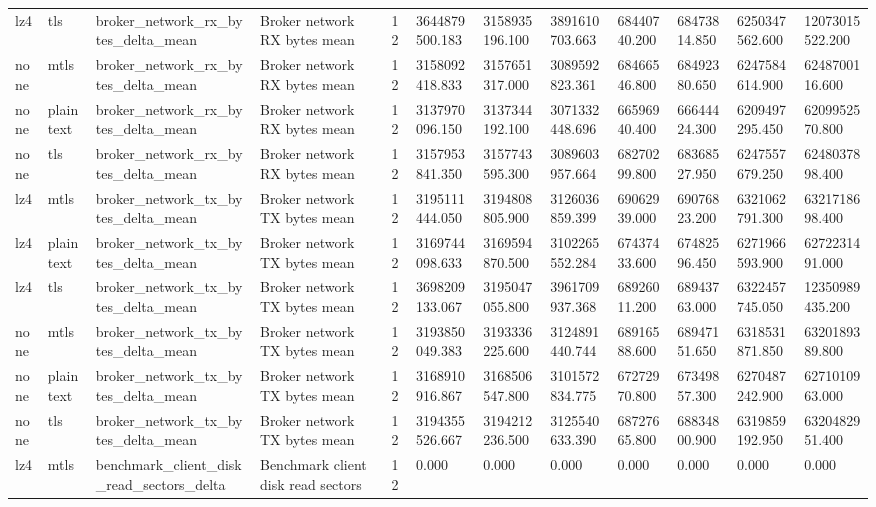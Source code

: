\begin{longtable}{llllllllllll}
lz4 & tls & broker\_network\_rx\_bytes\_delta\_mean & Broker network RX bytes mean & 12 & 3644879500.183 & 3158935196.100 & 3891610703.663 & 68440740.200 & 68473814.850 & 6250347562.600 & 12073015522.200 \\
none & mtls & broker\_network\_rx\_bytes\_delta\_mean & Broker network RX bytes mean & 12 & 3158092418.833 & 3157651317.000 & 3089592823.361 & 68466546.800 & 68492380.650 & 6247584614.900 & 6248700116.600 \\
none & plaintext & broker\_network\_rx\_bytes\_delta\_mean & Broker network RX bytes mean & 12 & 3137970096.150 & 3137344192.100 & 3071332448.696 & 66596940.400 & 66644424.300 & 6209497295.450 & 6209952570.800 \\
none & tls & broker\_network\_rx\_bytes\_delta\_mean & Broker network RX bytes mean & 12 & 3157953841.350 & 3157743595.300 & 3089603957.664 & 68270299.800 & 68368527.950 & 6247557679.250 & 6248037898.400 \\
lz4 & mtls & broker\_network\_tx\_bytes\_delta\_mean & Broker network TX bytes mean & 12 & 3195111444.050 & 3194808805.900 & 3126036859.399 & 69062939.000 & 69076823.200 & 6321062791.300 & 6321718698.400 \\
lz4 & plaintext & broker\_network\_tx\_bytes\_delta\_mean & Broker network TX bytes mean & 12 & 3169744098.633 & 3169594870.500 & 3102265552.284 & 67437433.600 & 67482596.450 & 6271966593.900 & 6272231491.000 \\
lz4 & tls & broker\_network\_tx\_bytes\_delta\_mean & Broker network TX bytes mean & 12 & 3698209133.067 & 3195047055.800 & 3961709937.368 & 68926011.200 & 68943763.000 & 6322457745.050 & 12350989435.200 \\
none & mtls & broker\_network\_tx\_bytes\_delta\_mean & Broker network TX bytes mean & 12 & 3193850049.383 & 3193336225.600 & 3124891440.744 & 68916588.600 & 68947151.650 & 6318531871.850 & 6320189389.800 \\
none & plaintext & broker\_network\_tx\_bytes\_delta\_mean & Broker network TX bytes mean & 12 & 3168910916.867 & 3168506547.800 & 3101572834.775 & 67272970.800 & 67349857.300 & 6270487242.900 & 6271010963.000 \\
none & tls & broker\_network\_tx\_bytes\_delta\_mean & Broker network TX bytes mean & 12 & 3194355526.667 & 3194212236.500 & 3125540633.390 & 68727665.800 & 68834800.900 & 6319859192.950 & 6320482951.400 \\
lz4 & mtls & benchmark\_client\_disk\_read\_sectors\_delta & Benchmark client disk read sectors & 12 & 0.000 & 0.000 & 0.000 & 0.000 & 0.000 & 0.000 & 0.000 \\

\end{longtable}
